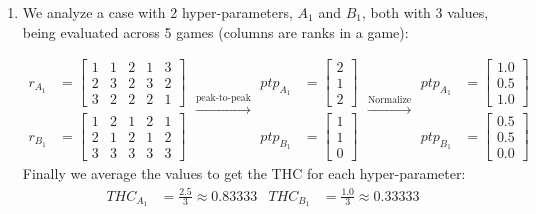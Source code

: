 \begin{enumerate}
    \item We analyze a case with 2 hyper-parameters, $A_1$ and $B_1$, both with 3 values, being evaluated across 5 games (columns are ranks in a game):

    \begin{equation*}
    \begin{aligned}
        r_{A_1} &= \begin{bmatrix}
                    1 & 1 & 2 & 1 & 3\\
                    2 & 3 & 2 & 3 & 2\\
                    3 & 2 & 2 & 2 & 1
                    \end{bmatrix} \\
        r_{B_1} &= \begin{bmatrix}
                    1 & 2 & 1 & 2 & 1\\
                    2 & 1 & 2 & 1 & 2\\
                    3 & 3 & 3 & 3 & 3
                    \end{bmatrix}
    \end{aligned}
    \xrightarrow{\text{peak-to-peak}}
    \begin{aligned}
        ptp_{A_1} &= \begin{bmatrix}
                    2\\
                    1\\
                    2
                    \end{bmatrix} \\
        ptp_{B_1} &= \begin{bmatrix}
                    1\\
                    1\\
                    0
                    \end{bmatrix}
    \end{aligned}
    \xrightarrow{\text{Normalize}}
    \begin{aligned}
        ptp_{A_1} &= \begin{bmatrix}
                    1.0\\
                    0.5\\
                    1.0
                    \end{bmatrix} \\
        ptp_{B_1} &= \begin{bmatrix}
                    0.5\\
                    0.5\\
                    0.0
                    \end{bmatrix}
    \end{aligned}
    \end{equation*}
    Finally we average the values to get the THC for each hyper-parameter:
        \begin{align}
            THC_{A_1} &= \frac{2.5}{3} \approx 0.83333  & THC_{B_1} &= \frac{1.0}{3} \approx 0.33333
        \end{align}


\end{enumerate}
